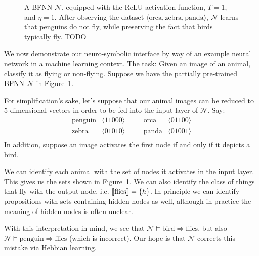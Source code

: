 \documentclass[letterpaper]{article}
\theoremstyle{definition}
\newcommand{\semantics}[1]{[\![\mbox{\em $ #1 $\/}]\!]}
\newcommand{\set}[1]{\{ #1 \}}
\newcommand{\Net}{\mathcal{N}}
\begin{document}
\begin{figure}
{
}
\caption{A BFNN $\Net$, equipped with the ReLU activation function, $T = 1$, and $\eta = 1$.  After observing the dataset $\langle \textrm{orca}, \textrm{zebra}, \textrm{panda} \rangle$, $\Net$ learns that penguins do not fly, while preserving the fact that birds typically fly. \textcolor{myred}{TODO}}
\label{fig:full-example}
\end{figure}

We now demonstrate our neuro-symbolic interface by way of an example neural network in a machine learning context.  The task: Given an image of an animal, classify it as flying or non-flying.  Suppose we have the partially pre-trained BFNN $\Net$ in  Figure~\ref{fig:full-example}.  

For simplification's sake, let's suppose that our animal images can be reduced to $5$-dimensional vectors in order to be fed into the input layer of $\Net$.  Say:
\[
\begin{array}{llcll}
\textrm{penguin} & \langle 1 1 0 0 0 \rangle & \quad & 
\textrm{orca} & \langle 0 1 1 0 0 \rangle \\
\textrm{zebra} & \langle 0 1 0 1 0 \rangle & \quad & 
\textrm{panda} & \langle 0 1 0 0 1 \rangle \\
\end{array}
\]
In addition, suppose an image activates the first node if and only if it depicts a bird.

We can identify each animal with the set of nodes it activates in the input layer.  This gives us the sets shown in Figure~\ref{fig:full-example}.  We can also identify the class of things that fly with the output node, i.e. $\semantics{\textup{flies}} = \set{h}$.  In principle we can identify propositions with sets containing hidden nodes as well, although in practice the meaning of hidden nodes is often unclear.

With this interpretation in mind, we see that $\Net \models \textrm{bird} \Rightarrow \textrm{flies}$, but also $\Net \models \textrm{penguin} \Rightarrow \textrm{flies}$ (which is incorrect).  Our hope is that $\Net$ corrects this mistake via Hebbian learning.
\end{document}
